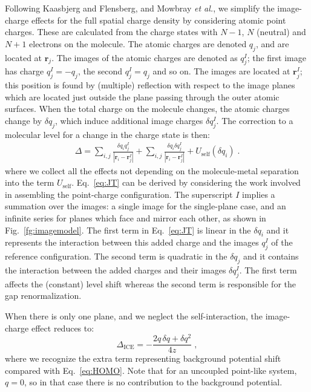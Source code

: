 \documentclass[aip,jcp,a4paper,reprint,floatfix,superscriptaddress]{revtex4-1}
\newcommand{\rijI}{|{\bm r}_i-{\bm r}_{j}^I|}
\newcommand{\etal}{\emph{et al.}\xspace}
\newcommand{\txt}[1]{{\text{#1}}}
\begin{document}
Following Kaasbjerg and Flensberg,\cite{Kaasbjerg2008} and Mowbray \etal\cite{Mowbray2008}, we simplify the image-charge effects for the full spatial charge density by considering atomic point charges.
These are calculated from the charge states with $N-1$, $N$ (neutral) and $N+1$ electrons on the molecule. The atomic charges are denoted $q_j$, and are located at ${\bm r}_j$. The images of the atomic charges are denoted as $q^I_j$; the first image has charge $q^I_j= -q_j$, the second $q^I_j = q_j$ and so on.
The images are located at ${\bm r}^I_j$; this position is found by (multiple) reflection with respect to the image planes which are located just outside the plane passing through the outer atomic surfaces.\cite{Smith1989,Quek2007} When the total charge on the molecule changes, the atomic charges change by $\delta q_j$, which induce additional image charges $\delta q^I_j$. The correction to a molecular level for a change in the charge state is then:
\begin{align}
\label{eq:JT}
\Delta = \sum_{i, j} \frac{\delta q_i q_j^I}{\rijI}
+ \sum_{i,j} \frac{\delta q_i \delta q_j^I}{\rijI} + U_\text{self}(\delta q_i)\;.
\end{align}
where we collect all the effects not depending on the molecule-metal separation into the term $U_\txt{self}$.
Eq.~\eqref{eq:JT} can be derived by considering the work involved in assembling the point-charge configuration.
The superscript $I$ implies a summation over the images: a single image for the single-plane case, and an infinite series for  planes which face and mirror each other, as shown in Fig.~\ref{fg:imagemodel}.
The first term in Eq.~\eqref{eq:JT} is linear in the 
$\delta q_i$ and it represents the interaction between this added charge and the images $q^I_j$ of the reference configuration.
The second term is quadratic in the $\delta q_j$ and it contains the interaction between the added charges and their images $\delta q^I_j$. The first term affects the (constant) level shift 
whereas the second term is responsible for the gap renormalization. 

When there is only one plane, and we neglect the self-interaction, the image-charge effect reduces to:
\[
\Delta_\text{ICE} = - \frac{2q\,\delta q + \delta q^2}{4z}\;,
\]
where we recognize the extra term representing background potential shift compared with Eq.~\eqref{eq:HOMO}. Note that for an uncoupled point-like system, $q=0$, so in that 
case there is no contribution to the background potential.
\end{document}

